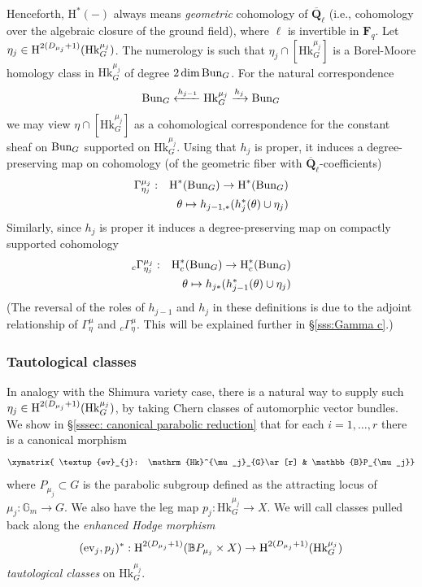 \documentclass[reqno]{amsart}
\numberwithin{equation}{subsection}
\theoremstyle{definition}
\def\BB{\mathbb{B}}
\def\GG{\mathbb{G}}
\newcommand{\Bun}{\textup{Bun}}
\newcommand\ev{\textup{ev}}
\newcommand\Hk{\mathrm{Hk}}
\newcommand{\Qlbar}{\overline{\Q}_\ell}
\newcommand{\cohog}[2]{\textup{H}^{#1}({#2})}     %
\newcommand{\cohoc}[2]{\textup{H}_{c}^{#1}({#2})}     %
\newcommand\mt{\mapsto}
\newcommand\G\Gamma
\renewcommand{\th}{\theta}
\newcommand{\y}{\eta}
\newcommand{\F}{\mathbf{F}}
\newcommand{\Q}{\mathbf{Q}}
\newcommand{\ol}[1]{\overline{#1}}
\newcommand{\rH}{\ensuremath{\mathrm{H}}\xspace}
\begin{document}
Henceforth, $\rH^*(-)$ always means \emph{geometric} cohomology of $\ol \Q_\ell$ (i.e., cohomology over the algebraic closure of the ground field), where $\ell$ is invertible in $\F_q$. Let  $\y_j \in \cohog{2(D_{\mu_j}+1)}{\Hk^{\mu_j}_{G}}$. The numerology is such that $\y_j \cap [\Hk^{\mu_j}_{G}]$ is a Borel-Moore homology class in $\Hk^{\mu_j}_{G}$ of degree $2\dim \Bun_{G}$. For the natural correspondence 
\[
\Bun_G \xleftarrow{h_{j-1}} \Hk_G^{\mu_j} \xrightarrow{h_{j}} \Bun_G
\]
we may view $\y\cap [\Hk^{\mu_j}_{G}] $ as a cohomological correspondence for the constant sheaf on $\Bun_{G}$ supported on $\Hk^{\mu_j}_{G}$. Using that  $h_{j}$ is proper, it induces a degree-preserving map on cohomology (of the geometric fiber with $\Qlbar$-coefficients)
\begin{eqnarray*}
\G^{\mu_j}_{\y_j}&:& \cohog{*}{\Bun_{G}}\to \cohog{*}{\Bun_{G}}\\
&&\th\mt h_{j-1,*}(h_{j}^{*}(\th)\cup \y_j)
\end{eqnarray*}
Similarly, since $h_j$ is proper it induces a degree-preserving map on compactly supported cohomology
\begin{eqnarray*}
{}_{c}\G^{\mu_j}_{\y_j}&:& \cohoc{*}{\Bun_{G}}\to \cohoc{*}{\Bun_{G}}\\
&&\th\mt h_{j*}(h_{j-1}^{*}(\th)\cup \y_j)
\end{eqnarray*}
(The reversal of the roles of $h_{j-1}$ and $h_{j}$ in these definitions is due to the adjoint relationship of $\G^{\mu}_{\y}$ and ${}_{c}\G^{\mu}_{\y}$. This will be explained further in \S \ref{sss:Gamma c}.)


\subsubsection{Tautological classes}
In analogy with the Shimura variety case, there is a natural way to supply such $\y_j \in \cohog{2(D_{\mu_j}+1)}{\Hk^{\mu_j}_{G}}$, by taking Chern classes of automorphic vector bundles. We show in \S\ref{sssec: canonical parabolic reduction} that for each $i=1, \ldots, r$ there is a canonical morphism %
\begin{equation*}
\xymatrix{ \ev_{j}: \Hk^{\mu_j}_{G}\ar[r] & \BB P_{\mu_j}} 
\end{equation*}
 where $P_{\mu_j} \subset G$ is the parabolic subgroup defined as the attracting locus of $\mu_j:\GG_m\to G$. We also have the leg map $p_j:\Hk^{\mu_j}_{G}\to X$. We will call classes pulled back along the {\em enhanced Hodge morphism}
\begin{equation}\label{eq:enhanced-hodge}
(\ev_{j},p_j)^\ast:  \cohog{2(D_{\mu_j}+1)}{\BB P_{\mu_j}\times X} \to \cohog{2(D_{\mu_j}+1)}{\Hk^{\mu_j}_{G}}
\end{equation}
{\em tautological classes} on $\Hk^{\mu_j}_{G}$.
\end{document}
